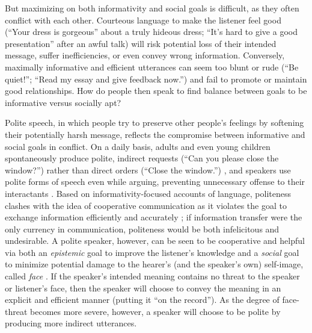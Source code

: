\documentclass[12pt]{article}
\begin{document}
But maximizing on both informativity and social goals is difficult, as they often conflict with each other. 
Courteous language to make the listener feel good 
(\enquote{Your dress is gorgeous} about a truly hideous dress; 
\enquote{It's hard to give a good presentation} after an awful talk) 
will risk potential loss of their intended message, suffer inefficiencies, or even convey wrong information. 
Conversely, maximally informative and efficient utterances can seem too blunt or rude 
(\enquote{Be quiet!}; \enquote{Read my essay and give feedback now.}) 
and fail to promote or maintain good relationships.
How do people then speak to find balance between goals to be informative versus socially apt?

Polite speech, in which people try to preserve other people's feelings by softening their potentially harsh message, 
reflects the compromise between informative and social goals in conflict.
On a daily basis,
adults and even young children spontaneously produce polite, indirect requests (``Can you please close the window?'') 
rather than direct orders (``Close the window.'') \cite{clark1980, axia1985}, 
and speakers use polite forms of speech even while arguing, preventing unnecessary offense to their interactants \cite{holtgraves1997}. 
Based on informativity-focused accounts of language, politeness clashes with the idea of cooperative communication 
as it violates the goal to exchange information efficiently and accurately \cite{grice1975};
if information transfer were the only currency in communication, politeness would be both infelicitous and undesirable.  
A polite speaker, however, can be seen to be cooperative and helpful via 
both an \emph{epistemic} goal to improve the listener's knowledge and 
a \emph{social} goal to minimize potential damage to the hearer's (and the speaker's own) self-image, called \emph{face} \cite{brown1987}. 
If the speaker's intended meaning contains no threat to the speaker or listener's face, 
then the speaker will choose to convey the meaning in an explicit and efficient manner (putting it \enquote{on the record}). 
As the degree of face-threat becomes more severe, however, a speaker will choose to be polite by producing more indirect utterances. 
\end{document}
